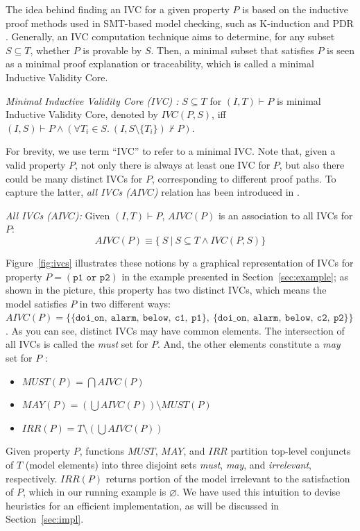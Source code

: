 The idea behind finding an IVC for a given property $P$ \cite{Ghass16} is based on the inductive proof methods used in SMT-based model checking, such as K-induction and PDR \cite{NFM2012:KaGaTiWh, amla2005analysis, Een2011:PDR}. Generally, an IVC computation technique aims to determine, for any subset $S \subseteq T$, whether $P$ is provable by $S$. Then, a minimal subset that satisfies $P$ is seen as a minimal proof explanation or traceability, which is called a minimal Inductive Validity Core.

\begin{definition}{\emph{Minimal Inductive Validity Core (IVC) \cite{Ghass16}:}}
  \label{def:minimal-ivc}
  $S \subseteq T$ for $(I, T)\vdash P$ is minimal Inductive Validity Core, 
  denoted by $IVC(P, S)$, iff
  $(I, S) \vdash P \wedge (\forall T_i \in S.~ (I, S\setminus\{ T_i \}) \nvdash P) $.
\end{definition}

For brevity, we use term ``IVC'' to refer to a minimal IVC. Note that, given a valid property $P$, not only there is always at least one IVC for $P$, but also there could be many distinct IVCs for $P$, corresponding to different proof paths. To capture the latter, \emph{all IVCs ($AIVC$)} relation has been introduced in \cite{Ghass16, Murugesan16:renext, Ghass17Cov}.
\begin{definition}{\emph{All IVCs ($AIVC$)\cite{Murugesan16:renext, Ghass17Cov}:}}
    \label{def:allivcs}
    Given $(I, T) \vdash P$, $AIVC(P)$ is an association to all IVCs for $P$: 
    $$ AIVC(P) \equiv  \{\ S~|~S \subseteq T \land  IVC(P, S)\} $$
\end{definition}

Figure~\ref{fig:ivcs} illustrates these notions by a graphical representation of IVCs for property $P = (\texttt{p1 or p2})$ in the example presented in Section~\ref{sec:example}; as shown in the picture, this property has two distinct IVCs, which means the model satisfies $P$ in two different ways: $AIVC(P) = \{ \{ \texttt{doi\_on},
~\texttt{alarm},~\texttt{below},~\texttt{c1},~\texttt{p1}\},~ \allowbreak  
\{ \texttt{doi\_on},~\texttt{alarm},
~\texttt{below},~\texttt{c2},~\texttt{p2}\}\}$. 
As you can see, distinct IVCs may have common elements. 
The intersection of all IVCs is called the \emph{must} set for $P$. 
And, the other elements constitute a \emph{may} set for $P$ \cite{Murugesan16:renext}: 
\begin{itemize}
  \item   $MUST (P) = \bigcap AIVC(P)$
  \item  $MAY(P) = (\bigcup AIVC (P)) \setminus MUST(P)$
  \item $IRR(P) = T \setminus (\bigcup AIVC(P))$
\end{itemize}
\noindent Given property $P$, functions $MUST$, $MAY$, and $IRR$ partition top-level conjuncts of $T$ (model elements) into three disjoint sets \emph{must}, \emph{may}, and \emph{irrelevant}, respectively. $IRR(P)$ returns portion of the model irrelevant to the satisfaction of $P$, which in our running example is $\varnothing$.
We have used this intuition to devise heuristics for an efficient implementation, as will be discussed in Section~\ref{sec:impl}.

